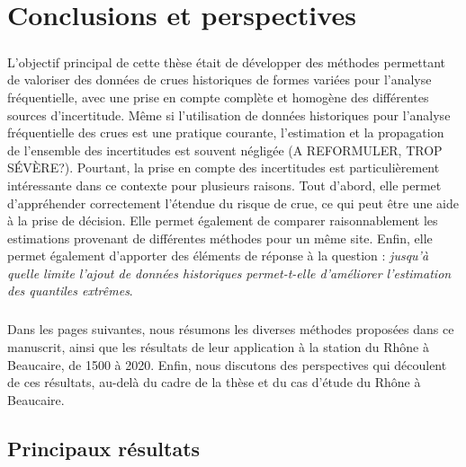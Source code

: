 \chapter{Conclusions et perspectives}
\label{chap:conclu}

\paragraph{} L'objectif principal de cette thèse était de développer des méthodes permettant de valoriser des données de crues historiques de formes variées pour l'analyse fréquentielle, avec une prise en compte complète et homogène des différentes sources d'incertitude. Même si l'utilisation de données historiques pour l'analyse fréquentielle des crues est une pratique courante, l'estimation et la propagation de l'ensemble des incertitudes est souvent négligée (A REFORMULER, TROP SÉVÈRE?). Pourtant, la prise en compte des incertitudes est particulièrement intéressante dans ce contexte pour plusieurs raisons. Tout d'abord, elle permet d'appréhender correctement l'étendue du risque de crue, ce qui peut être une aide à la prise de décision. Elle permet également de comparer raisonnablement les estimations provenant de différentes méthodes pour un même site. Enfin, elle permet également d'apporter des éléments de réponse à la question : \og \textit{jusqu'à quelle limite l'ajout de données historiques permet-t-elle d'améliorer l'estimation des quantiles extrêmes}\fg{}. 

\paragraph{} Dans les pages suivantes, nous résumons les diverses méthodes proposées dans ce manuscrit, ainsi que les résultats de leur application à la station du Rhône à Beaucaire, de 1500 à 2020. Enfin, nous discutons des perspectives qui découlent de ces résultats, au-delà du cadre de la thèse et du cas d'étude du Rhône à Beaucaire. 
	
	
	\section{Principaux résultats}
	
